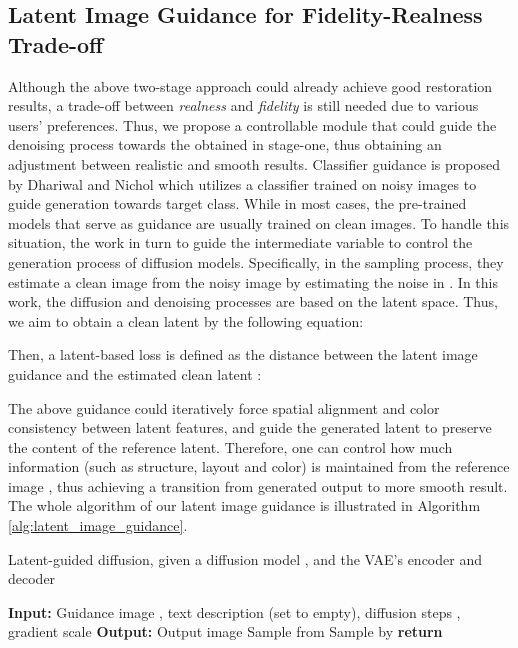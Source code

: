 \documentclass{article}
\begin{document}
\subsection{Latent Image Guidance for Fidelity-Realness Trade-off}
\label{sec:method3}
Although the above two-stage approach could already achieve good restoration results, a trade-off between \textit{realness} and \textit{fidelity} is still needed due to various users' preferences.
Thus, we propose a controllable module that could guide the denoising process towards the obtained  in stage-one, thus obtaining an adjustment between realistic and smooth results.
Classifier guidance is proposed by Dhariwal and Nichol \cite{beatsgan} which utilizes a classifier trained on noisy images to guide generation towards target class. While in most cases, the pre-trained models that serve as guidance are usually trained on clean images. To handle this situation, the work in \cite{blend, gdp} turn to guide the intermediate variable  to control the generation process of diffusion models. Specifically, in the sampling process, they estimate a clean image  from the noisy image  by
estimating the noise in . In this work, the diffusion and denoising processes are based on the latent space. Thus, we aim to obtain a clean latent  by the following equation:
 
Then, a latent-based loss  is defined as the  distance between the latent image guidance  and the estimated clean latent :
 
The above guidance could iteratively force spatial alignment and color consistency between latent features, and guide the generated latent to preserve the content of the reference latent.
Therefore, one can control how much information (such as structure, layout and color) is maintained from the reference image , thus achieving a transition from generated output to more smooth result. The whole algorithm of our latent image guidance is illustrated in Algorithm \ref{alg:latent_image_guidance}.


\begin{algorithm}[htbp]
    \caption{Latent-guided diffusion, given a diffusion model , and the VAE's encoder  and decoder }
    \label{alg:latent_image_guidance}
    \begin{algorithmic}
    \Statex \textbf{Input:} Guidance image , text description  (set to empty), diffusion steps , gradient scale 
    \Statex \textbf{Output:} Output image 
    \Statex Sample  from 
\State 
        \State 
        \State Sample  by 
    \EndFor
\State \textbf{return} 
    \end{algorithmic}
  \end{algorithm}
\end{document}
